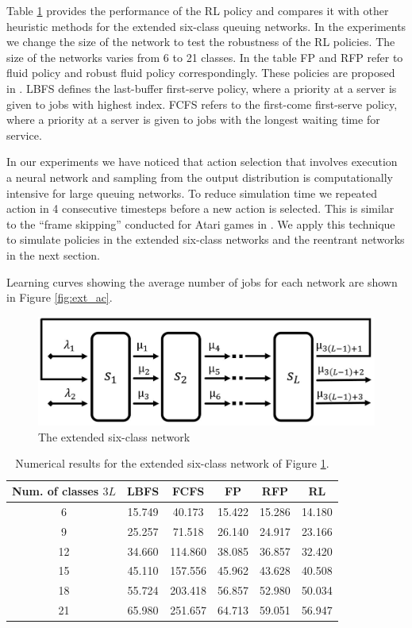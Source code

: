 \documentclass[11pt]{article}
\theoremstyle{definition}
\numberwithin{equation}{section}
\begin{document}
 Table \ref{tab6extRes} provides the performance of the RL policy and compares it with other heuristic methods for the extended six-class queuing networks. In the experiments we change the size of the network to test the robustness of the RL policies. The size of the networks varies from 6 to 21 classes.
In the table FP and RFP refer to fluid policy and robust fluid policy  correspondingly. These policies are proposed in \cite{Bertsimas2015}.
LBFS defines the last-buffer first-serve policy, where a priority at a server is given to jobs with highest index.  FCFS refers to the first-come first-serve policy, where a priority at a server is given to jobs with the longest waiting time for service.

In our experiments we have noticed that  action selection that involves execution a neural network and sampling from the output distribution  is computationally intensive for large queuing networks.
To reduce simulation time we repeated action in 4 consecutive timesteps before a new action is selected. This is similar to the ``frame skipping'' conducted for Atari games in \cite{Mnih2016}.
We apply this technique to simulate policies in the extended six-class networks and the reentrant networks in the next section.

Learning curves showing the average number of jobs for each network are shown in Figure \ref{fig:ext_ac}.

\begin{figure}[H]
\centering%
\includegraphics[width=.8\linewidth]{Paper_ext6.JPG}
\caption[]{The extended six-class network}
\label{fig1}%
\end{figure}

\begin{table}[H]
\centering%
\begin{tabular}{|c|c|c|c|c|c|}
  \hline
  Num. of classes $3L$  & LBFS & FCFS & FP & RFP & RL\\\hline
  6 & 15.749 & 40.173 & 15.422 & 15.286 &14.180 \\\hline
  9 & 25.257 & 71.518 & 26.140 & 24.917& 23.166 \\\hline
  12  & 34.660 & 114.860 & 38.085 & 36.857& 32.420\\\hline
  15  & 45.110  & 157.556  & 45.962 & 43.628& 40.508\\\hline
  18  & 55.724 & 203.418 & 56.857  & 52.980  & 50.034\\\hline
  21  & 65.980 & 251.657 & 64.713 & 59.051 & 56.947\\
  \hline
\end{tabular}
\caption[]{Numerical results for the extended six-class network of Figure \ref{fig1}.}\label{tab6extRes}
\end{table}
\end{document}
